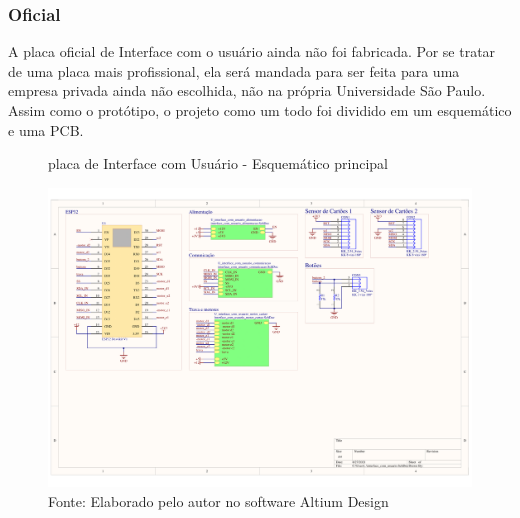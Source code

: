 \documentclass[../delivery_hospital_report.tex]{subfiles}
\begin{document}

\clearpage
\subsubsection{Oficial}

A placa oficial de Interface com o usuário ainda não foi fabricada. Por se tratar de uma placa mais profissional, ela será mandada para ser feita para uma empresa privada ainda não escolhida, não na própria Universidade São Paulo. Assim como o protótipo, o projeto como um todo foi dividido em um esquemático e uma PCB.

\begin{figure}[!ht]
\centering
    \caption{placa de Interface com Usuário - Esquemático principal }
    \centering %
    \includegraphics[width=17cm]{modulos/interface_com_usuario-1.png}
    \caption*{Fonte: Elaborado pelo autor no software Altium Design\cite{altium21} }
    \label{Protótipo placa de ## - Esquemático principal}
\end{figure}
\end{document}
